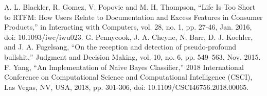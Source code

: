 \documentclass[conference]{IEEEtran}
\begin{document}
\begin{thebibliography}{00}
 A. L. Blackler, R. Gomez, V. Popovic and M. H. Thompson, ``Life Is Too Short to RTFM: How Users Relate to Documentation and Excess Features in Consumer Products,'' in Interacting with Computers, vol. 28, no. 1, pp. 27-46, Jan. 2016, doi: 10.1093/iwc/iwu023.
 G. Pennycook, J. A. Cheyne, N. Barr, D. J. Koehler, and J. A. Fugelsang, ``On the reception and detection of pseudo-profound bullshit,'' Judgment and Decision Making, vol. 10, no. 6, pp. 549–563, Nov. 2015.
 F. Yang, ``An Implementation of Naive Bayes Classifier,'' 2018 International Conference on Computational Science and Computational Intelligence (CSCI), Las Vegas, NV, USA, 2018, pp. 301-306, doi: 10.1109/CSCI46756.2018.00065.
\end{thebibliography}
\end{document}
